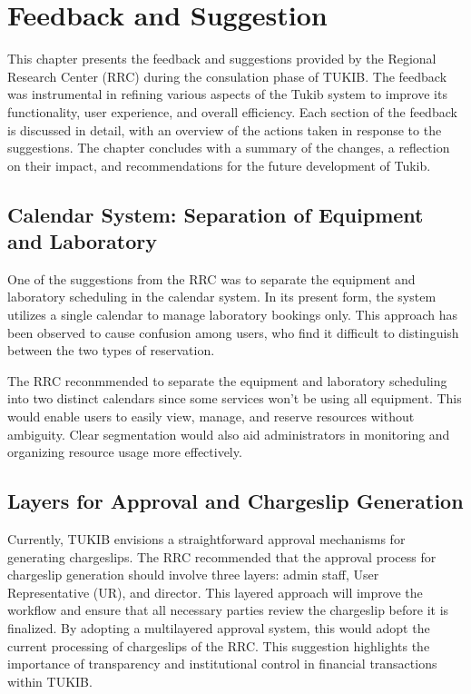 \chapter{Feedback and Suggestion}
This chapter presents the feedback and suggestions provided by the Regional Research Center (RRC) during the consulation phase of TUKIB. The feedback was instrumental in refining various aspects of the Tukib system to improve its functionality, user experience, and overall efficiency. Each section of the feedback is discussed in detail, with an overview of the actions taken in response to the suggestions. The chapter concludes with a summary of the changes, a reflection on their impact, and recommendations for the future development of Tukib.

\section{Calendar System: Separation of Equipment and Laboratory}
One of the suggestions from the RRC was to separate the equipment and laboratory scheduling in the calendar system. In its present form, the system utilizes a single calendar to manage laboratory bookings only. This approach has been observed to cause confusion among users, who find it difficult to distinguish between the two types of reservation.

The RRC reconmmended to separate the equipment and laboratory scheduling into two distinct calendars since some services won't be using all equipment. This would enable users to easily view, manage, and reserve resources without ambiguity. Clear segmentation would also aid administrators in monitoring and organizing resource usage more effectively.

\section{Layers for Approval and Chargeslip Generation}
Currently, TUKIB envisions a straightforward approval mechanisms for generating chargeslips. The RRC recommended that the approval process for chargeslip generation should involve three layers: admin staff, User Representative (UR), and director. This layered approach will improve the workflow and ensure that all necessary parties review the chargeslip before it is finalized. By adopting a multilayered approval system, this would adopt the current processing of chargeslips of the RRC. This suggestion highlights the importance of transparency and institutional control in financial transactions within TUKIB.


